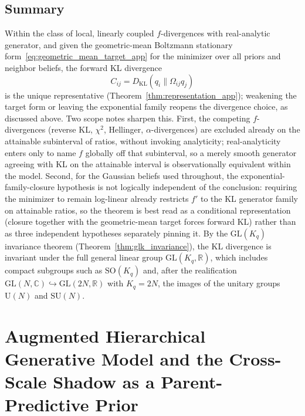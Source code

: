 \documentclass[11pt]{article}
\begin{document}
\subsection*{Summary}
Within the class of local, linearly coupled $f$-divergences with real-analytic generator, and given the geometric-mean Boltzmann stationary form~\eqref{eq:geometric_mean_target_app} for the minimizer over all priors and neighbor beliefs, the forward KL divergence
\[
\boxed{
C_{ij}=D_{\mathrm{KL}}(q_i \| \Omega_{ij} q_j)}
\]
is the unique representative (Theorem~\ref{thm:representation_app}); weakening the target form or leaving the exponential family reopens the divergence choice, as discussed above. Two scope notes sharpen this. First, the competing $f$-divergences (reverse KL, $\chi^2$, Hellinger, $\alpha$-divergences) are excluded already on the attainable subinterval of ratios, without invoking analyticity; real-analyticity enters only to name $f$ globally off that subinterval, so a merely smooth generator agreeing with KL on the attainable interval is observationally equivalent within the model. Second, for the Gaussian beliefs used throughout, the exponential-family-closure hypothesis is not logically independent of the conclusion: requiring the minimizer to remain log-linear already restricts $f'$ to the KL generator family on attainable ratios, so the theorem is best read as a conditional representation (closure together with the geometric-mean target forces forward KL) rather than as three independent hypotheses separately pinning it. By the $\mathrm{GL}(K_q)$ invariance theorem (Theorem~\ref{thm:glk_invariance}), the KL divergence is invariant under the full general linear group $\mathrm{GL}(K_q, \mathbb{R})$, which includes compact subgroups such as $\mathrm{SO}(K_q)$ and, after the realification $\mathrm{GL}(N, \mathbb{C}) \hookrightarrow \mathrm{GL}(2N, \mathbb{R})$ with $K_q = 2N$, the images of the unitary groups $\mathrm{U}(N)$ and $\mathrm{SU}(N)$.

\section{Augmented Hierarchical Generative Model and the Cross-Scale Shadow as a Parent-Predictive Prior}
\label{app:augmented_joint}
\end{document}
